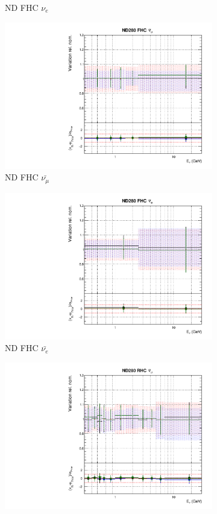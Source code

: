 \begin{figure}[t]
\begin{subfigure}{0.24\textwidth}
  \caption{ND FHC $\nu_e$}
\end{subfigure}
\begin{subfigure}{0.24\textwidth}
  \centering
  \includegraphics[width=0.95\linewidth]{figs/hptpcfitsflux_2}
  \caption{ND FHC $\bar{\nu_{\mu}}$}
\end{subfigure}
\begin{subfigure}{0.24\textwidth}
  \centering
  \includegraphics[width=0.95\linewidth]{figs/hptpcfitsflux_3}
  \caption{ND FHC $\bar{\nu_{e}}$}
\end{subfigure}
\begin{subfigure}{0.24\textwidth}
  \centering
  \includegraphics[width=0.95\linewidth]{figs/hptpcfitsflux_4}

\end{subfigure}
\end{figure}

